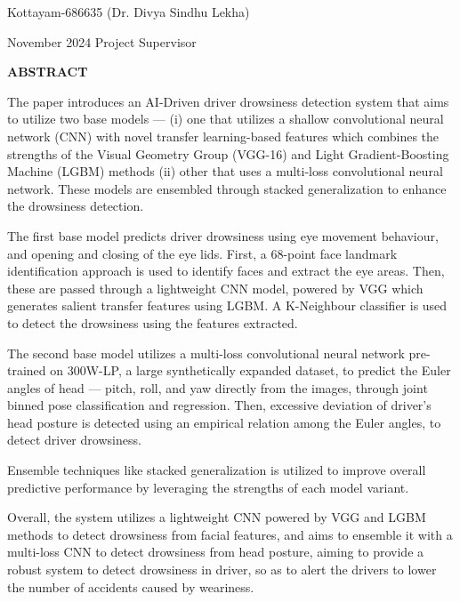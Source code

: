 \documentclass[12pt,a4wide]{report}
\theoremstyle{plain}
\theoremstyle{definition}
\theoremstyle{remark}
\begin{document}
\vspace{4cm}

\noindent Kottayam-686635  \hfill (Dr. Divya Sindhu Lekha)

\noindent November  2024 \hfill Project Supervisor

\clearpage






\begin{center}
{\Large{\bf{ABSTRACT}}}
\end{center}

The paper introduces an AI-Driven driver drowsiness detection system that aims to utilize two base models --- (i) one that utilizes a shallow convolutional neural network (CNN) with novel transfer learning-based features which combines the strengths of the Visual Geometry Group (VGG-16) and Light Gradient-Boosting Machine (LGBM) methods (ii) other that uses a multi-loss convolutional neural network. These models are ensembled through stacked generalization to enhance the drowsiness detection.


The first base model predicts driver drowsiness using eye movement behaviour, and opening and closing of the eye lids. First, a 68-point face landmark identification approach is
used to identify faces and extract the eye areas. Then, these are passed through a lightweight CNN model, powered by VGG which  generates salient transfer features using LGBM. A K-Neighbour classifier is used to detect the drowsiness using the features extracted.

The second base model utilizes a multi-loss convolutional neural network pre-trained on 300W-LP, a large synthetically expanded dataset, to predict the Euler angles of head --- pitch, roll, and yaw directly from the images,  through joint binned pose classification and regression. Then, excessive deviation of driver's head posture is detected using an empirical relation among the Euler angles, to detect driver drowsiness.

Ensemble techniques like stacked generalization is utilized to improve overall predictive performance by leveraging the strengths of each model variant.

Overall, the system utilizes a lightweight CNN powered by VGG and LGBM methods to detect drowsiness from facial features, and aims to ensemble it with a multi-loss CNN to detect drowsiness from head posture, aiming to provide a robust system to detect drowsiness in driver, so as to alert the drivers to lower the number of accidents caused by weariness.
\end{document}
